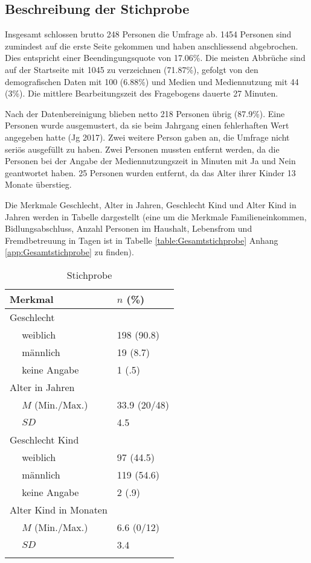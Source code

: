 \subsection{Beschreibung der Stichprobe}
Insgesamt schlossen brutto 248 Personen die Umfrage ab. 1454 Personen sind zumindest auf die erste Seite gekommen und haben anschliessend abgebrochen. Dies entspricht einer Beendingungsquote von 17.06\%. Die meisten Abbrüche sind auf der Startseite mit 1045 zu verzeichnen (71.87\%), gefolgt von den demografischen Daten mit 100 (6.88\%) und Medien und Mediennutzung mit 44 (3\%). Die mittlere Bearbeitungszeit des Fragebogens dauerte 27 Minuten. 

Nach der Datenbereinigung blieben netto 218 Personen übrig (87.9\%). Eine Personen wurde ausgemustert, da sie beim Jahrgang einen fehlerhaften Wert angegeben hatte (Jg 2017). Zwei weitere Person gaben an, die Umfrage nicht seriös ausgefüllt zu haben. Zwei Personen mussten entfernt werden, da die Personen bei der Angabe der Mediennutzungszeit in Minuten mit Ja und Nein geantwortet haben. 25 Personen wurden entfernt, da das Alter ihrer Kinder 13 Monate überstieg. 

Die Merkmale Geschlecht, Alter in Jahren, Geschlecht Kind und Alter Kind in Jahren werden in Tabelle  dargestellt (eine um die Merkmale Familieneinkommen, Bidlungsabschluss, Anzahl Personen im Haushalt, Lebensfrom und Fremdbetreuung in Tagen ist in Tabelle \ref{table:Gesamtstichprobe} Anhang \ref{app:Gesamtstichprobe} zu finden).

\begin{table}[htbp]
\begin{tabular}{m{0.5em}  m{10em}  m{5em}} 
  \hline\hline
  \multicolumn{2}{l}{\textbf{Merkmal}} & \textbf{$n$ (\%)} \\
  \hline
  \multicolumn{2}{l}{Geschlecht} \\ 
   & weiblich & 198 (90.8)\\ 
   & männlich & 19 (8.7)\\ 
   & keine Angabe & 1 (.5)\\ 
   
  \multicolumn{2}{l}{Alter in Jahren} \\
   & $M$ (Min./Max.) & 33.9 (20/48) \\
   & $SD$ & 4.5 \\
  
  \multicolumn{2}{l}{Geschlecht Kind} \\
   & weiblich & 97 (44.5)\\ 
   & männlich & 119 (54.6)\\ 
   & keine Angabe & 2 (.9)\\
  
  \multicolumn{2}{l}{Alter Kind in Monaten} \\
   &  $M$ (Min./Max.) & 6.6 (0/12)\\
   & $SD$ & 3.4\\
  \hline\hline
  &&\\
\end{tabular}
\caption{Stichprobe}
\label{table:Stichprobe}
\end{table}

